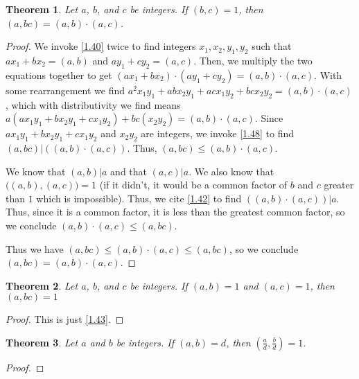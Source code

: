 \documentclass{article}
\newtheorem{thm}{Theorem}[section]
\numberwithin{equation}{thm}
\begin{document}
\begin{thm} \label{2.28}
  Let $a$, $b$, and $c$ be integers. If $(b, c) = 1$, then $(a, bc) = (a,b) \cdot (a,c)$.
\end{thm}

\begin{proof}
  We invoke \ref{1.40} twice to find integers $x_1, x_2, y_1, y_2$ such that $ax_1 + bx_2 = (a,b)$ and $ay_1 + cy_2 = (a,c)$. Then, we multiply the two equations together to get $(ax_1 + bx_2) \cdot (ay_1 + cy_2) = (a,b) \cdot (a,c)$. With some rearrangement we find $a^2x_1y_1 + abx_2y_1 + acx_1y_2 + bcx_2y_2 = (a,b) \cdot (a,c)$, which with distributivity we find means $a(ax_1y_1 + bx_2y_1 + cx_1y_2) + bc(x_2y_2) = (a,b) \cdot (a,c)$.
  Since $ax_1y_1 + bx_2y_1 + cx_1y_2$ and $x_2y_2$ are integers, we invoke \ref{1.48} to find $(a,bc) | \left( (a,b) \cdot (a,c) \right)$. Thus, $(a,bc) \leq (a,b) \cdot (a,c)$.

  We know that $(a,b) | a$ and that $(a, c) | a$. We also know that $\big( (a, b) , (a, c) \big) = 1$ (if it didn't, it would be a common factor of $b$ and $c$ greater than $1$ which is impossible). Thus, we cite \ref{1.42} to find $\left( (a,b) \cdot (a, c) \right) | a$. Thus, since it is a common factor, it is less than the greatest common factor, so we conclude $(a,b) \cdot (a,c) \leq (a, bc)$.

  Thus we have $(a,bc) \leq (a,b) \cdot (a,c) \leq (a, bc)$, so we conclude $(a,bc) = (a,b) \cdot (a,c)$.
\end{proof}



\begin{thm} \label{2.29}
  Let $a$, $b$, and $c$ be integers. If $(a,b) = 1$ and $(a,c) = 1$, then $(a, bc) = 1$
\end{thm}

\begin{proof}
  This is just \ref{1.43}.
\end{proof}



\begin{thm} \label{2.30}
  Let $a$ and $b$ be integers. If $(a,b) = d$, then $(\frac a d , \frac b d) = 1$.
\end{thm}

\begin{proof}
  
\end{proof}
\end{document}
